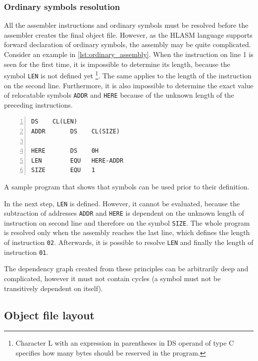\subsubsection{Ordinary symbols resolution}
\label{ordinary_resolution}
All the assembler instructions and ordinary symbols must be resolved before the assembler creates the final object file. However, as the HLASM language supports forward declaration of ordinary symbols, the assembly may be quite complicated. Consider an example in \cref{lst:ordinary_assembly}. When the instruction on line 1 is seen for the first time, it is impossible to determine its length, because the symbol \verb|LEN| is not defined yet \footnote{Character L with an expression in parentheses in DS operand of type C specifies how many bytes should be reserved in the program.}. The same applies to the length of the instruction on the second line. Furthermore, it is also impossible to determine the exact value of relocatable symbols \verb|ADDR| and \verb|HERE| because of the unknown length of the preceding instructions.

\begin{listing}[t]
	\begin{Verbatim}[numbers=left]
           DS    CL(LEN)
ADDR       DS    CL(SIZE)

HERE       DS    0H
LEN        EQU   HERE-ADDR
SIZE       EQU   1
	\end{Verbatim}
	\caption{A sample program that shows that symbols can be used prior to their definition.}
	\label{lst:ordinary_assembly}
\end{listing}


In the next step, \verb|LEN| is defined. However, it cannot be evaluated, because the subtraction of addresses \verb|ADDR| and \verb|HERE| is dependent on the unknown length of instruction on second line and therefore on the symbol \verb|SIZE|. The whole program is resolved only when the assembly reaches the last line, which defines the length of instruction \verb|02|. Afterwards, it is possible to resolve \verb|LEN| and finally the length of instruction \verb|01|.

The dependency graph created from these principles can be arbitrarily deep and complicated, however it must not contain cycles (a symbol must not be transitively dependent on itself).

\subsection{Object file layout}

